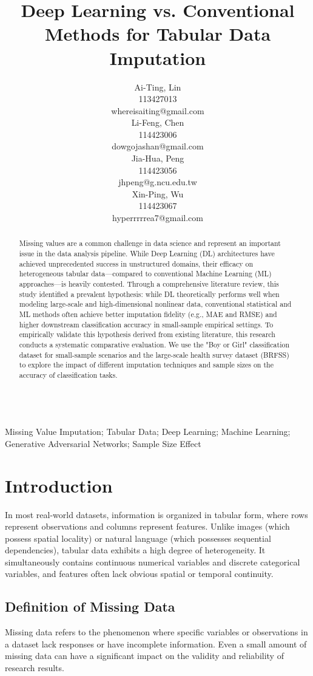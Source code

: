 \documentclass[twocolumn, 9pt]{extarticle}
\title{\sffamily\fontsize{18}{20}\selectfont\textbf{Deep Learning vs. Conventional Methods for Tabular Data Imputation}}
\author{
    \begin{minipage}{0.45\textwidth}
        \centering\sffamily
        \fontsize{12}{16}\selectfont 
        Ai-Ting, Lin\\
        \vspace{-0.5em} %
        113427013\\
        whereisaiting@gmail.com
    \end{minipage}\hfill
    \begin{minipage}{0.45\textwidth}
        \centering\sffamily
        \fontsize{12}{16}\selectfont 
        Li-Feng, Chen\\
        \vspace{-0.5em}
        114423006\\
        dowgojashan@gmail.com
    \end{minipage}
    
    \vspace{3ex} %
    
    \begin{minipage}{0.45\textwidth}
        \centering\sffamily
        \fontsize{12}{16}\selectfont 
        Jia-Hua, Peng\\
        \vspace{-0.5em}
        114423056\\
        jhpeng@g.ncu.edu.tw
    \end{minipage}\hfill
    \begin{minipage}{0.45\textwidth}
        \centering\sffamily
        \fontsize{12}{16}\selectfont 
        Xin-Ping, Wu\\
        \vspace{-0.5em}
        114423067\\
        hyperrrrrea7@gmail.com
    \end{minipage}
}
\date{} %
\date{}
\begin{document}
\maketitle

\begin{abstract}
Missing values are a common challenge in data science and represent an important issue in the data analysis pipeline. While Deep Learning (DL) architectures have achieved unprecedented success in unstructured domains, their efficacy on heterogeneous tabular data—compared to conventional Machine Learning (ML) approaches—is heavily contested. Through a comprehensive literature review, this study identified a prevalent hypothesis: while DL theoretically performs well when modeling large-scale and high-dimensional nonlinear data, conventional statistical and ML methods often achieve better imputation fidelity (e.g., MAE and RMSE) and higher downstream classification accuracy in small-sample empirical settings. To empirically validate this hypothesis derived from existing literature, this research conducts a systematic comparative evaluation. We use the "Boy or Girl" classification dataset for small-sample scenarios and the large-scale health survey dataset (BRFSS) to explore the impact of different imputation techniques and sample sizes on the accuracy of classification tasks.
\end{abstract}

\vspace{0.35em}
 \\ %
Missing Value Imputation; Tabular Data; Deep Learning; Machine Learning; Generative Adversarial Networks; Sample Size Effect


\section{Introduction}
In most real-world datasets, information is organized in tabular form, where rows represent observations and columns represent features. Unlike images (which possess spatial locality) or natural language (which possesses sequential dependencies), tabular data exhibits a high degree of heterogeneity. It simultaneously contains continuous numerical variables and discrete categorical variables, and features often lack obvious spatial or temporal continuity. 

\subsection{Definition of Missing Data}
Missing data refers to the phenomenon where specific variables or observations in a dataset lack responses or have incomplete information. Even a small amount of missing data can have a significant impact on the validity and reliability of research results.
\end{document}
